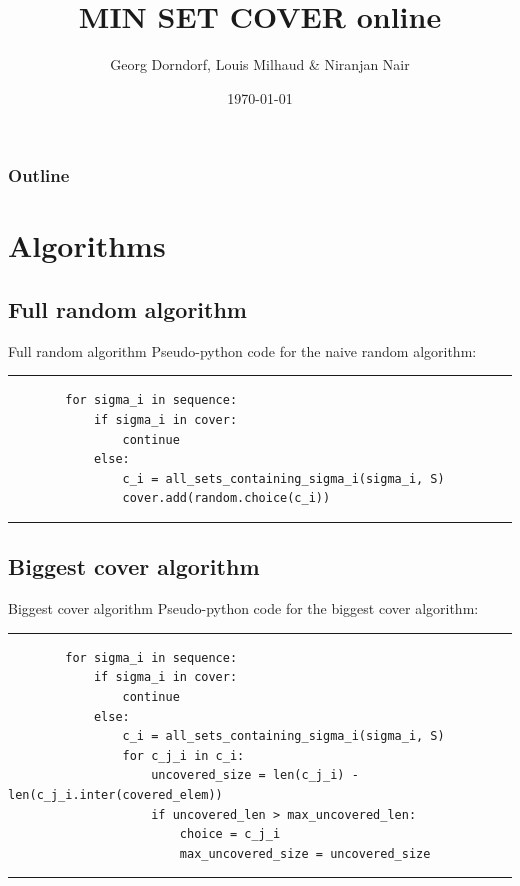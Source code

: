 \documentclass[aspectratio=169]{beamer}
\title{MIN SET COVER online}
\author{Georg Dorndorf, Louis Milhaud \& Niranjan Nair}
\institute{Université Paris Saclay}
\date{\today}
\begin{document}
    \begin{frame}
        \titlepage
    \end{frame}

    \begin{frame}
        \frametitle{Outline}
        \tableofcontents
    \end{frame}

    \section{Algorithms}
    
    \subsection{Full random algorithm}
    \begin{frame}[fragile]{Full random algorithm}
    Pseudo-python code for the naive random algorithm:
    \rule{\textwidth}{1pt}
    \scriptsize
    \begin{verbatim}
        for sigma_i in sequence:
            if sigma_i in cover:
                continue
            else:
                c_i = all_sets_containing_sigma_i(sigma_i, S)
                cover.add(random.choice(c_i))
    \end{verbatim}
    \rule{\textwidth}{1pt}
    \end{frame}
    
    \subsection{Biggest cover algorithm}
    \begin{frame}[fragile]{Biggest cover algorithm}
    Pseudo-python code for the biggest cover algorithm:
    \rule{\textwidth}{1pt}
    \scriptsize
    \begin{verbatim}
        for sigma_i in sequence:
            if sigma_i in cover:
                continue
            else:
                c_i = all_sets_containing_sigma_i(sigma_i, S)
                for c_j_i in c_i:
                    uncovered_size = len(c_j_i) - len(c_j_i.inter(covered_elem))
                    if uncovered_len > max_uncovered_len:
                        choice = c_j_i
                        max_uncovered_size = uncovered_size
    \end{verbatim}
    \rule{\textwidth}{1pt}
    \end{frame}
    
\end{document}
